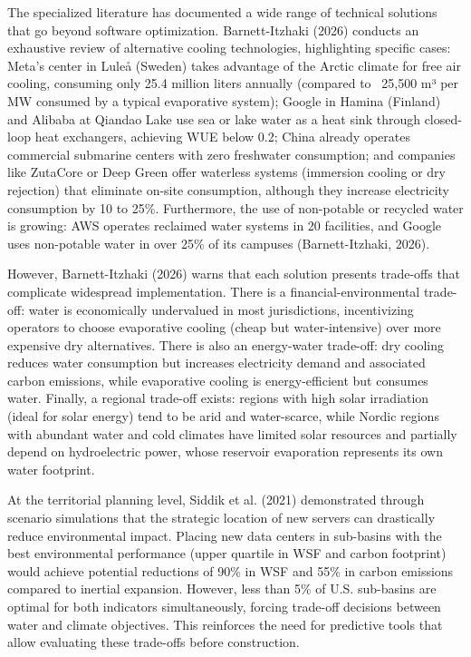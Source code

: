 \documentclass[conference]{IEEEtran}
\begin{document}
The specialized literature has documented a wide range of technical solutions that go beyond software optimization. Barnett-Itzhaki (2026) conducts an exhaustive review of alternative cooling technologies, highlighting specific cases: Meta's center in Luleå (Sweden) takes advantage of the Arctic climate for free air cooling, consuming only 25.4 million liters annually (compared to ~25,500 m³ per MW consumed by a typical evaporative system); Google in Hamina (Finland) and Alibaba at Qiandao Lake use sea or lake water as a heat sink through closed-loop heat exchangers, achieving WUE below 0.2; China already operates commercial submarine centers with zero freshwater consumption; and companies like ZutaCore or Deep Green offer waterless systems (immersion cooling or dry rejection) that eliminate on-site consumption, although they increase electricity consumption by 10 to 25\%. Furthermore, the use of non-potable or recycled water is growing: AWS operates reclaimed water systems in 20 facilities, and Google uses non-potable water in over 25\% of its campuses (Barnett-Itzhaki, 2026).

However, Barnett-Itzhaki (2026) warns that each solution presents trade-offs that complicate widespread implementation. There is a financial-environmental trade-off: water is economically undervalued in most jurisdictions, incentivizing operators to choose evaporative cooling (cheap but water-intensive) over more expensive dry alternatives. There is also an energy-water trade-off: dry cooling reduces water consumption but increases electricity demand and associated carbon emissions, while evaporative cooling is energy-efficient but consumes water. Finally, a regional trade-off exists: regions with high solar irradiation (ideal for solar energy) tend to be arid and water-scarce, while Nordic regions with abundant water and cold climates have limited solar resources and partially depend on hydroelectric power, whose reservoir evaporation represents its own water footprint.

At the territorial planning level, Siddik et al. (2021) demonstrated through scenario simulations that the strategic location of new servers can drastically reduce environmental impact. Placing new data centers in sub-basins with the best environmental performance (upper quartile in WSF and carbon footprint) would achieve potential reductions of 90\% in WSF and 55\% in carbon emissions compared to inertial expansion. However, less than 5\% of U.S. sub-basins are optimal for both indicators simultaneously, forcing trade-off decisions between water and climate objectives. This reinforces the need for predictive tools that allow evaluating these trade-offs before construction.
\end{document}
